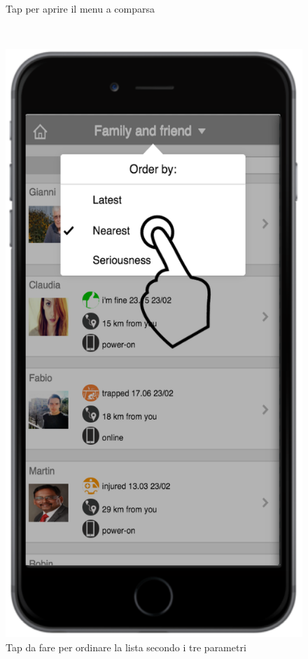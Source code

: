 \begin{figure}
\begin{minipage}[b]{6cm}
	\caption{Tap per aprire il menu a comparsa }
	\label{fig:comparsa}
 \end{minipage}
 \ \hspace{6 mm} \hspace{7 mm} \
 \begin{minipage}[b]{6cm}
\centering
	\includegraphics[scale=0.6]{interfaccia/etichetta.png}
	\caption{Tap da fare per ordinare la lista secondo i tre parametri }
	\label{fig:etichetta}
 \end{minipage}
\end{figure}

